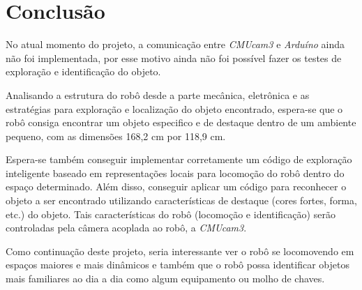 \chapter{Conclusão}

No atual momento do projeto, a comunicação entre \textit{CMUcam3} e \textit{Arduíno} ainda não foi implementada, por esse motivo ainda não foi possível fazer os testes de exploração e identificação do objeto.

Analisando a estrutura do robô desde a parte mecânica, eletrônica e as estratégias para exploração e localização do objeto encontrado, espera-se que o robô consiga encontrar um objeto especifico e de destaque dentro de um ambiente pequeno, com as dimensões 168,2 cm por 118,9 cm.

Espera-se também conseguir implementar corretamente um código de exploração inteligente baseado em representações locais para locomoção do robô dentro do espaço determinado. Além disso, conseguir aplicar um código para reconhecer o objeto a ser encontrado utilizando características de destaque (cores fortes, forma, etc.) do objeto. Tais características do robô (locomoção e identificação) serão controladas pela câmera acoplada ao robô, a \textit{CMUcam3}.

Como continuação deste projeto, seria interessante ver o robô se locomovendo em espaços maiores e mais dinâmicos e também que o robô possa identificar objetos mais familiares ao dia a dia como algum equipamento ou molho de chaves.
